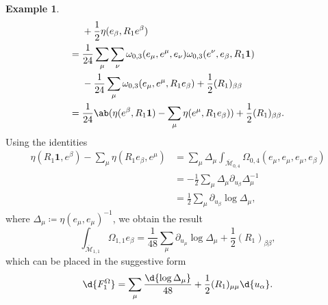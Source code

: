 \documentclass[10pt]{amsart}
\theoremstyle{definition}
\newtheorem{exm}[thm]{Example}
\theoremstyle{remark}
\theoremstyle{plain}
\theoremstyle{definition}
\theoremstyle{remark}
\newcommand{\Mbar}{\overline{\mathcal{M}}}
\newcommand{\1}{\mathbf{1}}
\newcommand{\2}{\mathbf{2}}
\newcommand{\3}{\mathbf{3}}
\begin{document}
\begin{exm}
\begin{align*}
        &+ \frac{1}{2} \eta(e_{\beta}, R_1 e^{\beta}) \\
        ={}& \frac{1}{24} \sum_{\mu}\sum_{\nu} \omega_{0,3}(e_{\mu}, e^{\mu}, e_{\nu})\omega_{0,3}(e^{\nu}, e_{\beta}, R_1 \1) \\
        &-\frac{1}{24} \sum_{\mu} \omega_{0,3}(e_{\mu}, e^{\mu}, R_1 e_{\beta}) + \frac{1}{2} (R_1)_{\beta\beta} \\
        ={}& \frac{1}{24} \ab(\eta(e^{\beta}, R_1 \1) - \sum_{\mu} \eta(e^{\mu}, R_1 e_{\beta})) + \frac{1}{2} (R_1)_{\beta\beta}.
    \end{align*}
    Using the identities
    \begin{equation}\label{eqn:m04identities}
    \begin{aligned}
        \eta(R_1 \1, e^{\beta}) - \sum_{\mu} \eta(R_1 e_{\beta}, e^{\mu}) &= \sum_{\mu} \Delta_{\mu} \int_{\Mbar_{0,4}} \Omega_{0,4}(e_{\mu}, e_{\mu}, e_{\mu}, e_{\beta}) \\
        &= -\frac{1}{2}\sum_{\mu} \Delta_{\mu} \partial_{u_{\beta}} \Delta_{\mu}^{-1} \\
        &= \frac{1}{2} \sum_{\mu} \partial_{u_{\beta}} \log \Delta_{\mu},
    \end{aligned}
    \end{equation}
    where $\Delta_{\mu} \coloneqq \eta(e_{\mu}, e_{\mu})^{-1}$, we obtain the result
    \[ \int_{\Mbar_{1,1}} \Omega_{1,1} e_{\beta} = \frac{1}{48} \sum_{\mu} \partial_{u_{\mu}} \log \Delta_{\mu} + \frac{1}{2} (R_1)_{\beta\beta}, \]
    which can be placed in the suggestive form
    \[ \d{F_1^{\Omega}} = \sum_{\mu} \frac{\d{\log \Delta_{\mu}}}{48} + \frac{1}{2} (R_1)_{\mu\mu} \d{u_{\alpha}}. \]


\end{exm}
\end{document}
